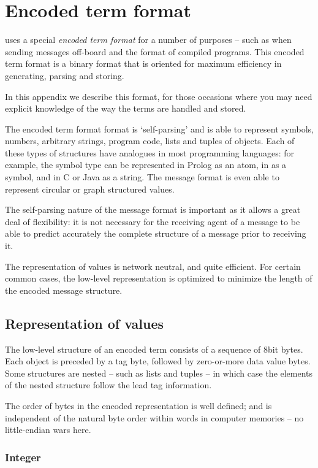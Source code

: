 \chapter{Encoded term format}
\label{encoded}

\go uses a special \emph{encoded term format} for a number of purposes -- such as when sending messages off-board and the format of compiled programs. This encoded term format is a binary format that is oriented for maximum efficiency in generating, parsing and storing.

In this appendix we describe this format, for those occasions where you may need explicit knowledge of the way the terms are handled and stored.

The encoded term format format is `self-parsing' and is able to represent symbols, numbers, arbitrary strings, program code, lists and tuples of  objects. Each of these types of structures have analogues in most programming languages: for example, the symbol type can be represented in Prolog as an atom, in \go as a symbol, and in C or Java as a string. The message format is even able to represent circular or graph structured values.

The self-parsing nature of the message format is important as it allows a great deal of flexibility: it is not necessary for the receiving agent of a message to be able to predict accurately the complete structure of a message prior to receiving it. 

The representation of values is network neutral, and quite efficient. For certain common cases, the low-level representation is optimized to minimize the length of the encoded message structure.

\section{Representation of values}
\label{encoded:representation}


The low-level structure of an encoded term consists of a sequence of 8bit bytes. Each object is preceded by a tag byte, followed by zero-or-more data value bytes. Some structures are nested -- such as lists and tuples -- in which case the elements of the nested structure follow the lead tag information.

The order of bytes in the encoded representation is well defined; and is independent of the natural byte order within words in computer memories -- no little-endian wars here. 

\subsection{Integer}
\label{encoded:integer}

